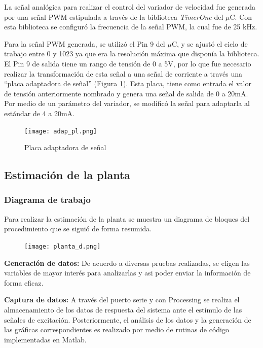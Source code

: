 La señal analógica para realizar el control del variador de velocidad fue generada por una señal PWM estipulada a través de la biblioteca \textit{TimerOne} del $\mu$C. Con esta biblioteca se configuró la frecuencia de la señal PWM, la cual fue de 25 kHz. 

Para la señal PWM generada, se utilizó el Pin 9 del $\mu$C, y se ajustó el ciclo de trabajo entre 0 y 1023 ya que era la resolución máxima que disponía la biblioteca. El Pin 9 de salida tiene un rango de tensión de 0 a 5V, por lo que fue necesario realizar la transformación de esta señal a una señal de corriente a través una “placa adaptadora de señal” (Figura \ref{fig:adapt}). Esta placa, tiene como entrada el valor de tensión anteriormente nombrado y genera una señal de salida de 0 a 20mA. Por medio de un parámetro del variador, se modificó la señal para adaptarla al estándar de 4 a 20mA.


\begin{figure}[htbp]
	\centering
	\texttt{[image: adap\_pl.png]}
	\caption{Placa adaptadora de señal}
	\label{fig:adapt}
\end{figure}



\subsection{Estimación de la planta} \label{sec:estima}
    \subsubsection{Diagrama de trabajo}

Para realizar la estimación de la planta se muestra un diagrama de bloques del procedimiento que se siguió de forma resumida.

\begin{figure}[htb]
	\centering
	\texttt{[image: planta\_d.png]}
	\label{fig:planta_d}
\end{figure}

 \textbf{Generación de datos:} De acuerdo a diversas pruebas realizadas, se eligen las variables de mayor interés para analizarlas y asi poder enviar la información de forma eficaz.

 \textbf{Captura de datos:} A través del puerto serie y con Processing se realiza el almacenamiento de los datos de respuesta del sistema ante el estímulo de las señales de excitación. Posteriormente, el análisis de los datos y la generación de las gráficas correspondientes es realizado por medio de rutinas de código implementadas en Matlab.

